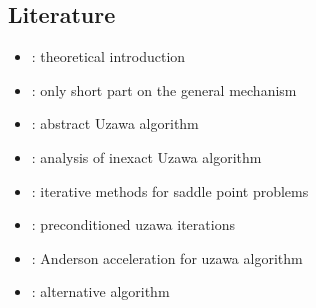 \documentclass[12pt,a4paper,twoside]{article}
\numberwithin{equation}{section}
\begin{document}
\subsection{Literature}
\begin{itemize}
\item \cite{uzawa1958iterative}: theoretical introduction
\item \cite{aujol2008introduction}: only short part on the general mechanism
\item \cite{bacuta2006unified}: abstract Uzawa algorithm
	\item \cite{bramble1997analysis}: analysis of inexact Uzawa algorithm
\item \cite{zulehner2002analysis}: iterative methods for saddle point problems
	\item \cite{graser2007preconditioned}: preconditioned uzawa iterations
\item\cite{ho2017accelerating}: Anderson acceleration for uzawa algorithm
\item \cite{robichaud1990iterative}: alternative algorithm
\end{itemize}



\end{document}
